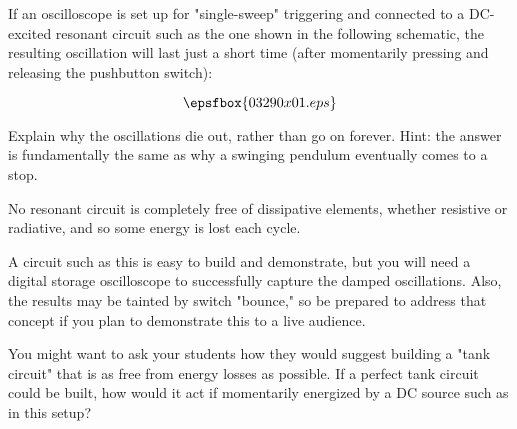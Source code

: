 

If an oscilloscope is set up for "single-sweep" triggering and connected to a DC-excited resonant circuit such as the one shown in the following schematic, the resulting oscillation will last just a short time (after momentarily pressing and releasing the pushbutton switch):

$$\epsfbox{03290x01.eps}$$

Explain why the oscillations die out, rather than go on forever.  Hint: the answer is fundamentally the same as why a swinging pendulum eventually comes to a stop.







No resonant circuit is completely free of dissipative elements, whether resistive or radiative, and so some energy is lost each cycle.







A circuit such as this is easy to build and demonstrate, but you will need a digital storage oscilloscope to successfully capture the damped oscillations.  Also, the results may be tainted by switch "bounce," so be prepared to address that concept if you plan to demonstrate this to a live audience.

You might want to ask your students how they would suggest building a "tank circuit" that is as free from energy losses as possible.  If a perfect tank circuit could be built, how would it act if momentarily energized by a DC source such as in this setup?




